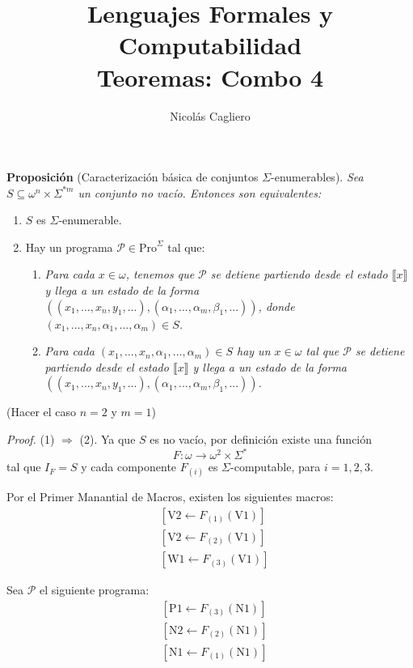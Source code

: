\documentclass{article}
\title{Lenguajes Formales y Computabilidad \\
        \large Teoremas: Combo 4 }
\author{Nicolás Cagliero}
\begin{document}
\maketitle

\textbf{Proposición} (Caracterización básica de conjuntos $\Sigma$-enumerables). 
\textit{Sea $S \subseteq \omega^n \times \Sigma^{*m}$ un conjunto no vacío. Entonces son equivalentes:}

\begin{enumerate}
    \item $S$ es $\Sigma$-enumerable.
    \item Hay un programa $\mathcal{P} \in \text{Pro}^{\Sigma}$ tal que:
    \begin{enumerate}
        \item \textit{Para cada $x \in \omega$, tenemos que $\mathcal{P}$ se detiene partiendo desde el estado 
        $\llbracket x \rrbracket$ y llega a un estado de la forma $((x_1, ..., x_n, y_1, ...), (\alpha_1, ..., \alpha_m, \beta_1, ...))$, 
        donde $(x_1, ..., x_n, \alpha_1, ..., \alpha_m) \in S$.}
        
        \item \textit{Para cada $(x_1, ..., x_n, \alpha_1, ..., \alpha_m) \in S$ hay un $x \in \omega$ tal que $\mathcal{P}$ 
        se detiene partiendo desde el estado $\llbracket x \rrbracket$ y llega a un estado de la forma 
        $((x_1, ..., x_n, y_1, ...), (\alpha_1, ..., \alpha_m, \beta_1, ...))$.}
    \end{enumerate}
\end{enumerate}

\medskip

(Hacer el caso $n = 2$ y $m = 1$)
\medskip

\textit{Proof.} (1) $\Rightarrow$ (2). Ya que $S$ es no vacío, por definición existe una función 
\[
F : \omega \to \omega^2 \times \Sigma^*
\]
tal que $I_F = S$ y cada componente $F_{(i)}$ es $\Sigma$-computable, para $i = 1, 2, 3$.

Por el Primer Manantial de Macros, existen los siguientes macros:
\[
\begin{aligned}
&[\text{V2} \leftarrow F_{(1)}(\text{V1})] \\
&[\text{V2} \leftarrow F_{(2)}(\text{V1})] \\
&[\text{W1} \leftarrow F_{(3)}(\text{V1})]
\end{aligned}
\]

Sea $\mathcal{P}$ el siguiente programa:
\[
\begin{aligned}
&[\text{P}1 \leftarrow F_{(3)}(\text{N1})] \\
&[\text{N2} \leftarrow F_{(2)}(\text{N1})] \\
&[\text{N1} \leftarrow F_{(1)}(\text{N1})]
\end{aligned}
\]
\end{document}
